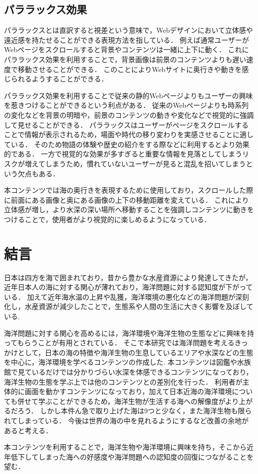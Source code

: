 \documentclass[12pt,a4j,titlepage]{ltjsarticle}
\begin{document}
\subsection{パララックス効果}
パララックスとは直訳すると視差という意味で，Webデザインにおいて立体感や遠近感を持たせることができる表現方法を指している．
例えば通常ユーザーがWebページをスクロールすると背景やコンテンツは一緒に上下に動く．
これにパララックス効果を利用することで，背景画像は前景のコンテンツよりも遅い速度で移動させることができる．
このことによりWebサイトに奥行きや動きを感じられるようすることができる．\par
パララックス効果を利用することで従来の静的Webページよりもユーザーの興味を惹きつけることができるという利点がある．
従来のWebページよりも時系列の変化などを背景の明暗や，前景のコンテンツの動きや変化などで視覚的に強調して見せることができる．
パララックスはユーザーがページをスクロールすることで情報が表示されるため，場面や時代の移り変わりを実感させることに適している．
そのため物語の体験や歴史の紹介をする際などに利用するとより効果的である．
一方で視覚的な効果が多すぎると重要な情報を見落としてしまうリスクが増えてしまうため，慣れていないユーザーが見ると混乱を招いてしまうという欠点もある．\par
本コンテンツでは海の奥行きを表現するために使用しており，スクロールした際に前面にある画像と奥にある画像の上下の移動距離を変えている．
これにより立体感が増し，より水深の深い場所へ移動することを強調しコンテンツに動きをつけることで，使用者がより視覚的に楽しめるようになっている．
\clearpage

\section{結言}\label{結言}
日本は四方を海で囲まれており，昔から豊かな水産資源により発達してきたが，近年日本人の海に対する関心が薄れており，海洋問題に対する認知度が下がっている．
加えて近年海水温の上昇や乱獲，海洋環境の悪化などの海洋問題が深刻化し，水産資源が減少したことで，生態系や人間の生活に大きく影響を及ぼしている.\par
海洋問題に対する関心を高めるには，海洋環境や海洋生物の生態などに興味を持ってもらうことが有用とされている．
そこで本研究では海洋問題を考えるきっかけとして，日本の海の特徴や海洋生物の生息しているエリアや水深などの生態を中心に，海洋環境を学べるコンテンツの作成した.
本コンテンツは図鑑や水族館で見ているだけでは分かりづらい水深を体感できるコンテンツになっており，海洋生物の生態を学ぶ上では他のコンテンツとの差別化を行った．
利用者が主体的に画面を動かすコンテンツになっており，加えて日本近海の海洋環境についても併せて学ぶことができるため，海洋生物が生活する海への解像度がより上がるだろう．
しかし本件ん急で取り上げた海は9つと少なく，また海洋生物も限られてしまっている．
今後は世界の海の中を見れるようにするなど改善の余地があると考える．\par
本コンテンツを利用することで，海洋生物や海洋環境に興味を持ち，そこから近年低下してしまった海への好感度や海洋問題への認知度の回復につながることを望む．
\clearpage
\end{document}
